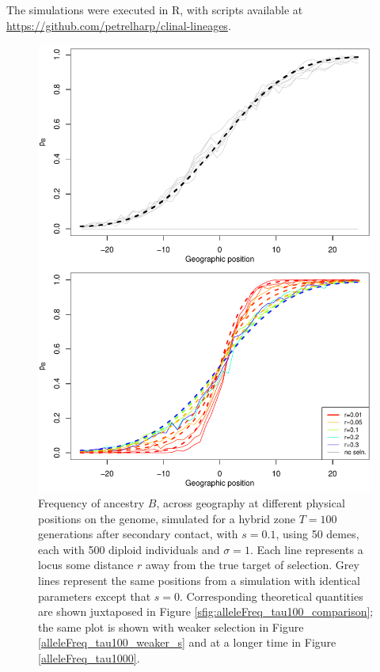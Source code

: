 \documentclass[11pt,letterpaper]{article}
\begin{document}
The simulations were executed in R, with scripts available at
\url{https://github.com/petrelharp/clinal-lineages}.

\begin{figure}
\includegraphics{figs/alleleFrequencies_sim_comparison_revision_original.pdf}
\caption{
    Frequency of ancestry $B$,
    across geography at different physical positions on the genome, simulated for a hybrid zone
     $T=100$ generations after secondary contact, with $s=0.1$,
     using 50 demes, each with 500 diploid individuals and $\sigma=1$.
    Each line represents a locus some distance $r$ away from the true target of selection.
    Grey lines represent the same positions from a simulation with
    identical parameters except that $s=0$.
    Corresponding theoretical quantities are shown juxtaposed in Figure \ref{sfig:alleleFreq_tau100_comparison};
    the same plot is shown with weaker selection in Figure \ref{alleleFreq_tau100_weaker_s} and at a longer time in Figure \ref{alleleFreq_tau1000}.
}\label{alleleFreq_tau100}
\end{figure}
\end{document}
